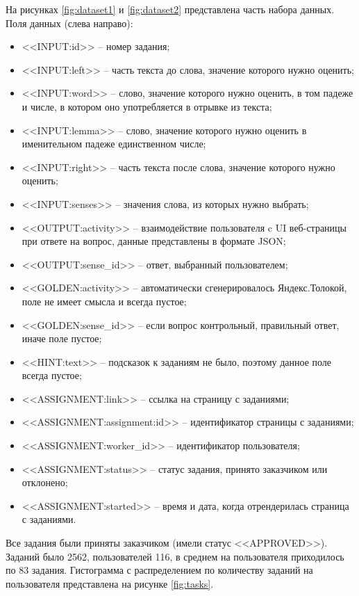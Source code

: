 \documentclass[specification,annotation,times]{itmo-student-thesis}
\begin{document}
На рисунках \ref{fig:dataset1} и \ref{fig:dataset2} представлена часть набора данных. Поля данных (слева направо):
\begin{itemize}
    \item <<INPUT:id>> -- номер задания;
    \item <<INPUT:left>> -- часть текста до слова, значение которого нужно оценить;
    \item <<INPUT:word>> -- слово, значение которого нужно оценить, в том падеже и числе, в котором оно употребляется в отрывке из текста;
    \item <<INPUT:lemma>> -- слово, значение которого нужно оценить в именительном падеже единственном числе;
    \item <<INPUT:right>> -- часть текста после слова, значение которого нужно оценить;
    \item <<INPUT:senses>> -- значения слова, из которых нужно выбрать;
    \item <<OUTPUT:activity>> -- взаимодействие пользователя c UI веб-страницы при ответе на вопрос, данные представлены в формате JSON;
    \item <<OUTPUT:sense\_id>> -- ответ, выбранный пользователем;
    \item <<GOLDEN:activity>> -- автоматически сгенерировалось Яндекс.Толокой, поле не имеет смысла и всегда пустое;
    \item <<GOLDEN:sense\_id>> -- если вопрос контрольный, правильный ответ, иначе поле пустое;
    \item <<HINT:text>> -- подсказок к заданиям не было, поэтому данное поле всегда пустое;
    \item <<ASSIGNMENT:link>> -- ссылка на страницу с заданиями;
    \item <<ASSIGNMENT:assignment:id>> -- идентификатор страницы с заданиями;
    \item <<ASSIGNMENT:worker\_id>> -- идентификатор пользователя;
    \item <<ASSIGNMENT:status>> -- статус задания, принято заказчиком или отклонено;
    \item <<ASSIGNMENT:started>> -- время и дата, когда отрендерилась страница с заданиями.
\end{itemize}

Все задания были приняты заказчиком (имели статус <<APPROVED>>). Заданий было 2562, пользователей 116, в среднем на пользователя приходилось по 83 задания. Гистограмма с распределением по количеству заданий на пользователя представлена на рисунке \ref{fig:tasks}. 
\end{document}
